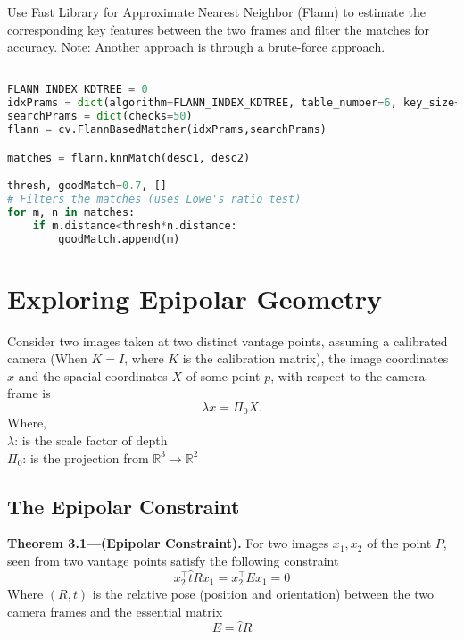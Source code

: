 \documentclass{article}
\begin{document}
Use Fast Library for Approximate Nearest Neighbor (Flann) to estimate the corresponding key features between the two frames and filter the matches for accuracy. Note: Another approach is through a brute-force approach.
\begin{lstlisting}[language=python]

FLANN_INDEX_KDTREE = 0
idxPrams = dict(algorithm=FLANN_INDEX_KDTREE, table_number=6, key_size=12, multi_probe_level=1)
searchPrams = dict(checks=50)
flann = cv.FlannBasedMatcher(idxPrams,searchPrams) 

matches = flann.knnMatch(desc1, desc2)

thresh, goodMatch=0.7, []
# Filters the matches (uses Lowe's ratio test)
for m, n in matches:
    if m.distance<thresh*n.distance:
        goodMatch.append(m)

\end{lstlisting}


\newpage
\section{Exploring Epipolar Geometry}
Consider two images taken at two distinct vantage points, assuming a calibrated camera (When $K=I$, where $K$ is the calibration matrix), the image coordinates $x$ and the spacial coordinates $X$ of some point $p$, with respect to the camera frame is $$\lambda x=\Pi_0 X.$$
Where,\\
$\lambda$: is the scale factor of depth\\
$\Pi_0$: is the projection from $\mathbb{R}^3 \to \mathbb{R}^2$
\subsection{The Epipolar Constraint}
\begin{tcolorbox}[enhanced,breakable,sharp corners, colback=purple!5!white, colframe=purple!55!black, boxrule=0mm,top=0mm,bottom=0mm,leftrule=1mm, drop shadow=black!40!white]
    {\color{purple!55!black} \textbf{Theorem 3.1---(Epipolar Constraint). }} 
    For two images $x_1, x_2$ of the point $P$, seen from two vantage points satisfy the following constraint
\[x_2^\top\hat{t}Rx_1 = x_2^\top Ex_1=0\]
Where $(R, t)$ is the relative pose (position and orientation) between the two camera frames and the essential matrix
$$E = \hat{t}R$$
\end{tcolorbox}
\end{document}
